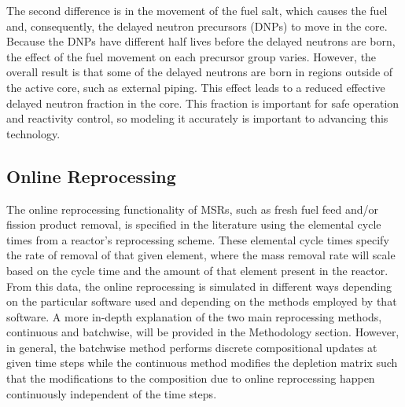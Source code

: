 The second difference is in the movement of the fuel salt, which causes the fuel and, consequently, the delayed neutron precursors (DNPs) to move in the core. Because the DNPs have different half lives before the delayed neutrons are born, the effect of the fuel movement on each precursor group varies.
However, the overall result is that some of the delayed neutrons are born in regions outside of the active core, such as external piping.
This effect leads to a reduced effective delayed neutron fraction in the core.
This fraction is important for safe operation and reactivity control, so modeling it accurately is important to advancing this technology.

\subsection{Online Reprocessing}

The online reprocessing functionality of MSRs, such as fresh fuel feed and/or fission product removal, is specified in the literature using the elemental cycle times from a reactor's reprocessing scheme. These elemental cycle times specify the rate of removal of that given element, where the mass removal rate will scale based on the cycle time and the amount of that element present in the reactor.
From this data, the online reprocessing is simulated in different ways depending on the particular software used and depending on the methods employed by that software.
A more in-depth explanation of the two main reprocessing methods, continuous and batchwise, will be provided in the Methodology section.
However, in general, the batchwise method performs discrete compositional updates at given time steps while the continuous method modifies the depletion matrix such that the modifications to the composition due to online reprocessing happen continuously independent of the time steps.


